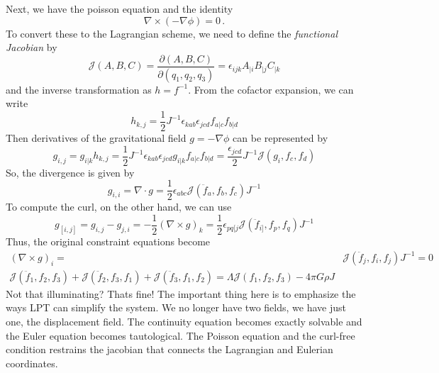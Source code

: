 Next, we have the poisson equation and the identity
\begin{equation}
	\nabla \times (-\nabla \phi) = 0\,.
\end{equation}
To convert these to the Lagrangian scheme, we need to define the \emph{functional Jacobian} by
\begin{equation}
	\mathcal{J}(A,B,C) = \frac{\partial(A,B,C)}{\partial(q_1,q_2,q_3)} = \epsilon_{ijk}A_{|i}B_{|j}C_{|k}
\end{equation}
and the inverse transformation as $h=f^{-1}$. From the cofactor expansion, we can write
\begin{equation}
	h_{k,j} = \frac{1}{2}J^{-1}\epsilon_{kab}\epsilon_{jcd}f_{a|c} f_{b|d}
\end{equation}
Then derivatives of the gravitational field $g=-\nabla\phi$ can be represented by
\begin{equation}
	g_{i,j} = g_{i|k}h_{k,j} = \frac{1}{2}J^{-1}\epsilon_{kab}\epsilon_{jcd}g_{i|k}f_{a|c} f_{b|d} = \frac{\epsilon_{jcd}}{2}J^{-1}\mathcal{J}(g_i,f_c,f_d)
\end{equation}
So, the divergence is given by
\begin{equation}
	g_{i,i} = \nabla\cdot g = \frac{1}{2}\epsilon_{abc}\mathcal{J}(\ddot f_a,f_b,f_c)J^{-1}
\end{equation}
To compute the curl, on the other hand, we can use
\begin{equation}
	g_{[i,j]} = g_{i,j} - g_{j,i} = -\frac{1}{2}(\nabla\times g)_k = \frac{1}{2}\epsilon_{pq[j}\mathcal{J}(\ddot f_{i]},f_p,f_q)J^{-1}
\end{equation}
Thus, the original constraint equations become
\begin{equation}
	\begin{split}
		(\nabla\times g)_i =& \mathcal{J}(\ddot{f}_j,f_i,f_j)J^{-1} = 0 \\
		\mathcal{J}(\ddot{f}_1,f_2,f_3) + \mathcal{J}(\ddot{f}_2,f_3,f_1) + \mathcal{J}(\ddot{f}_3,f_1,f_2) = \Lambda\mathcal{J}(f_1,f_2,f_3) - 4\pi G \rho J
	\end{split}
\end{equation}
Not that illuminating? Thats fine! The important thing here is to emphasize the ways LPT can simplify the system. We no longer have two fields, we have just one, the displacement field. The continuity equation becomes exactly solvable and the Euler equation becomes tautological. The Poisson equation and the curl-free condition restrains the jacobian that connects the Lagrangian and Eulerian coordinates.


